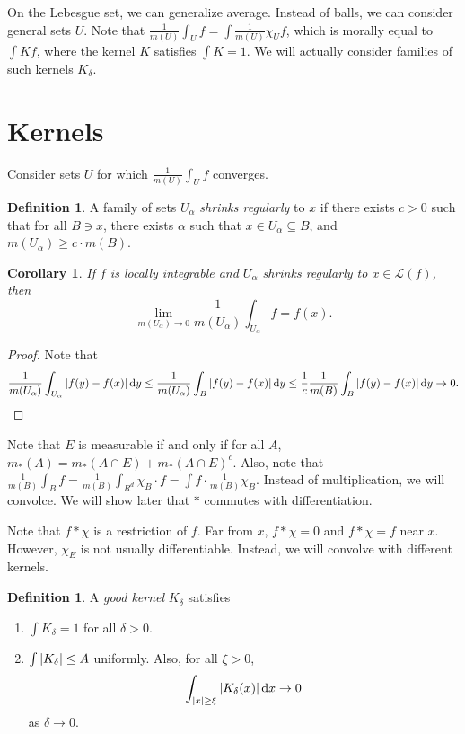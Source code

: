 \documentclass[leqno, openany]{memoir}
\newtheorem{cor}[thm]{Corollary}
\theoremstyle{definition}
\newtheorem{defn}[thm]{Definition}
\theoremstyle{remark}
\theoremstyle{plain}
\theoremstyle{definition}
\theoremstyle{remark}
\newcommand{\mc}[1]{\mathcal{#1}}
\begin{document}
On the Lebesgue set, we can generalize average. Instead of balls, we can
consider general sets $U$. Note that $\frac{1}{m(U)} \int_U f = \int
\frac{1}{m(U)} \chi_U f$, which is morally equal to $\int Kf$, where the kernel
$K$ satisfies $\int K = 1$. We will actually consider families of such kernels
$K_{\delta}$.

\section{Kernels}%

Consider sets $U$ for which $\frac{1}{m(U)} \int_U f$ converges.

\begin{defn} A family of sets $U_{\alpha}$ \textit{shrinks regularly} to $x$ if
there exists $c > 0$ such that for all $B \ni x$, there exists $\alpha$ such
that $x \in U_{\alpha} \subseteq B$, and $m(U_{\alpha}) \geq c \cdot m(B)$.
\end{defn}

\begin{cor} If $f$ is locally integrable and $U_{\alpha}$ shrinks regularly to
    $x \in \mc{L}(f)$, then \[ \lim_{m(U_{\alpha}) \to 0}
    \frac{1}{m(U_{\alpha})} \int_{U_{\alpha}} f = f(x). \] \end{cor}

\begin{proof} Note that \[ \frac{1}{m(U_{\alpha})} \int_{U_{\alpha}} \abs{f(y)
- f(x)} \dd{y} \leq \frac{1}{m(U_{\alpha})} \int_B \abs{f(y) - f(x)} \dd{y}
\leq \frac{1}{c} \frac{1}{m(B)} \int_B \abs{f(y) - f(x)} \dd{y} \to 0. \qedhere
\] \end{proof}

Note that $E$ is measurable if and only if for all $A$, $m_*(A) = m_*(A \cap E)
+ m_*(A \cap E)^c$. Also, note that $\frac{1}{m(B)} \int_B f = \frac{1}{m(B)}
\int_{R^d} \chi_B \cdot f = \int f \cdot \frac{1}{m(B)} \chi_B$. Instead of
multiplication, we will convolce. We will show later that $*$ commutes with
differentiation.

Note that $f * \chi$ is a restriction of $f$. Far from $x$, $f * \chi = 0$ and
$f * \chi = f$ near $x$. However, $\chi_E$ is not usually differentiable.
Instead, we will convolve with different kernels.

\begin{defn} A \textit{good kernel} $K_{\delta}$ satisfies \begin{enumerate}
    \item $\int K_{\delta} = 1$ for all $\delta > 0$.  \item $\int
        \abs{K_{\delta}} \leq A$ uniformly. Also, for all $\xi > 0$, \[
        \int_{\abs{x} \geq \xi} \abs{K_{\delta}(x)} \dd{x} \to 0 \] as $\delta
\to 0$.  \end{enumerate} \end{defn}
\end{document}
